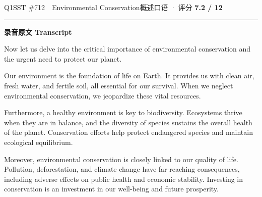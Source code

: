 \documentclass[11pt]{article}
\newcommand{\ptesub}[1]{%
  \par\needspace{2\baselineskip}\smallskip
  {\color{cAccent}\rule[-0.2ex]{3pt}{1.05em}}\hspace{6pt}%
  {\bfseries\color{cHead}#1}\par\nopagebreak\smallskip}
\begin{document}

\begin{qblock}{Q1\quad SST \#712\ \ Environmental Conservation}{概述口语 · 评分 \textcolor{cAccent}{\bfseries 7.2 / 12}}
\ptesub{录音原文 Transcript}
\begin{promptbox}
Now let us delve into the critical importance of environmental conservation and the urgent need to protect our planet.

Our environment is the foundation of life on Earth. It provides us with clean air, fresh water, and fertile soil, all essential for our survival. When we neglect environmental conservation, we jeopardize these vital resources.

Furthermore, a healthy environment is key to biodiversity. Ecosystems thrive when they are in balance, and the diversity of species sustains the overall health of the planet. Conservation efforts help protect endangered species and maintain ecological equilibrium.

Moreover, environmental conservation is closely linked to our quality of life. Pollution, deforestation, and climate change have far-reaching consequences, including adverse effects on public health and economic stability. Investing in conservation is an investment in our well-being and future prosperity.


\end{promptbox}
\end{qblock}
\end{document}
